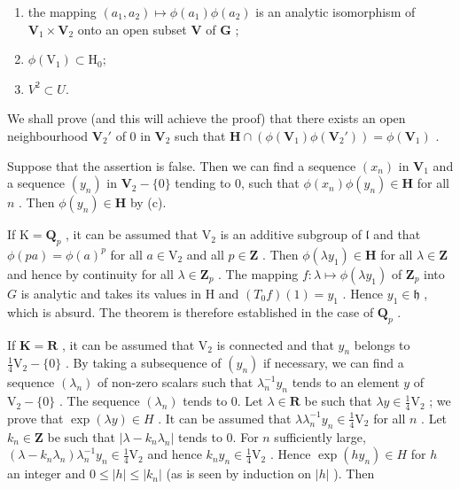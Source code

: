 \begin{enumerate}
\def\labelenumi{(\alph{enumi})}
\item
  the mapping \((a_{1}, a_{2}) \mapsto \phi(a_{1})\phi(a_{2})\) is an analytic isomorphism of \(\mathbf{V}_{1} \times \mathbf{V}_{2}\) onto an open subset \(\mathbf{V}\) of \(\mathbf{G}\) ;
\item
  \(\phi (\mathrm{V}_1)\subset \mathrm{H}_0;\)
\item
  \(V^{2} \subset U.\)
\end{enumerate}

We shall prove (and this will achieve the proof) that there exists an open neighbourhood \(\mathbf{V}_2'\) of 0 in \(\mathbf{V}_2\) such that \(\mathbf{H} \cap (\phi(\mathbf{V}_1)\phi(\mathbf{V}_2')) = \phi(\mathbf{V}_1)\) .

Suppose that the assertion is false. Then we can find a sequence \((x_{n})\) in \(\mathbf{V}_1\) and a sequence \((y_{n})\) in \(\mathbf{V}_2 - \{0\}\) tending to 0, such that \(\phi (x_n)\phi (y_n)\in \mathbf{H}\) for all \(n\) . Then \(\phi (y_n)\in \mathbf{H}\) by (c).

If \(\mathrm{K} = \mathbf{Q}_p\) , it can be assumed that \(\mathrm{V}_2\) is an additive subgroup of \(\mathfrak{l}\) and that \(\phi (pa) = \phi (a)^p\) for all \(a\in \mathrm{V}_2\) and all \(p\in \mathbf{Z}\) . Then \(\phi (\lambda y_1)\in \mathbf{H}\) for all \(\lambda \in \mathbf{Z}\) and hence by continuity for all \(\lambda \in \mathbf{Z}_p\) . The mapping \(f\colon \lambda \mapsto \phi (\lambda y_1)\) of \(\mathbf{Z}_p\) into \(G\) is analytic and takes its values in H and \((T_0f)(1) = y_1\) . Hence \(y_{1}\in \mathfrak{h}\) , which is absurd. The theorem is therefore established in the case of \(\mathbf{Q}_p\) .

If \(\mathbf{K} = \mathbf{R}\) , it can be assumed that \(\mathrm{V}_2\) is connected and that \(y_{n}\) belongs to \(\frac{1}{4}\mathrm{V}_2 - \{0\}\) . By taking a subsequence of \((y_n)\) if necessary, we can find a sequence \((\lambda_n)\) of non-zero scalars such that \(\lambda_n^{-1}y_n\) tends to an element \(y\) of \(\mathrm{V}_2 - \{0\}\) . The sequence \((\lambda_n)\) tends to 0. Let \(\lambda \in \mathbf{R}\) be such that \(\lambda y \in \frac{1}{4}\mathrm{V}_2\) ; we prove that \(\exp (\lambda y) \in H\) . It can be assumed that \(\lambda\lambda_n^{-1}y_n \in \frac{1}{4}\mathrm{V}_2\) for all \(n\) . Let \(k_n \in \mathbf{Z}\) be such that \(|\lambda - k_n\lambda_n|\) tends to 0. For \(n\) sufficiently large, \((\lambda - k_n\lambda_n)\lambda_n^{-1}y_n \in \frac{1}{4}\mathrm{V}_2\) and hence \(k_n y_n \in \frac{1}{4}\mathrm{V}_2\) . Hence \(\exp (hy_n) \in H\) for \(h\) an integer and \(0 \leqslant |h| \leqslant |k_n|\) (as is seen by induction on \(|h|\) ). Then

